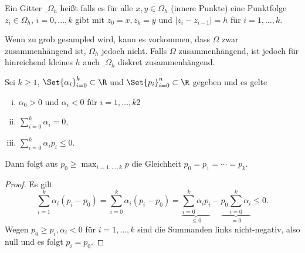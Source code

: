 \begin{df} \label{2.14}
	Ein Gitter $\_\Omega_h$ heißt  falls es für alle $x,y \in \Omega_h$ (innere Punkte) eine Punktfolge $z_i \in \Omega_h$, $i = 0, \dotsc, k$ gibt mit $z_0 = x, z_k = y$ und $|z_i - z_{i-1}| = h$ für $i = 1, \dotsc, k$.
	\begin{note}
		Wenn zu grob gesampled wird, kann es vorkommen, dass $\Omega$ zwar zusammenhängend ist, $\Omega_h$ jedoch nicht.
		Falls $\Omega$ zusammenhängend, ist jedoch für hinreichend kleines $h$ auch $\_\Omega_h$ diskret zusammenhängend.
	\end{note}
\end{df}

\begin{lem}[Sternlemma] \label{2.15}
	Sei $k \ge 1$, $\Set{\alpha_i}_{i=0}^k \subset \R$ und $\Set{p_i}_{i=0}^n \subset \R$ gegeben und es gelte
	\begin{enumerate}[i)]
		\item
			$\alpha_0 > 0$ und $\alpha_i < 0$ für $i = 1, \dotsc, k$2
		\item
			$\sum_{i=0}^k \alpha_i = 0$,
		\item
			$\sum_{i=0}^k \alpha_i p_i \le 0$.
	\end{enumerate}
	Dann folgt aus $p_0 \ge \max_{i=1,\dotsc, k} p$ die Gleichheit $p_0 = p_1 = \dotsb = p_k$.
	\begin{proof}
		Es gilt
		\[
			\sum_{i=1}^k \alpha_i(p_i-p_0)
			= \sum_{i=0}^k \alpha_i (p_i-p_0)
			= \underbrace{\sum_{i=0}^k \alpha_i p_i}_{\le 0} - \underbrace{p_0 \sum_{i=0}^k \alpha_i}_{=0}
			\le 0.
		\]
		Wegen $p_0 \ge p_i, \alpha_i < 0$ für $i = 1, \dotsc, k$ sind die Summanden links nicht-negativ, also null und es folgt $p_i = p_0$.
	\end{proof}
\end{lem}

